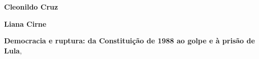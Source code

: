 \textbf{Cleonildo Cruz} \lipsum[1]

\textbf{Liana Cirne} \lipsum[2] 

\textbf{Democracia e ruptura: da Constituição de 1988 ao golpe e à prisão de Lula}, \lipsum[3]\par







